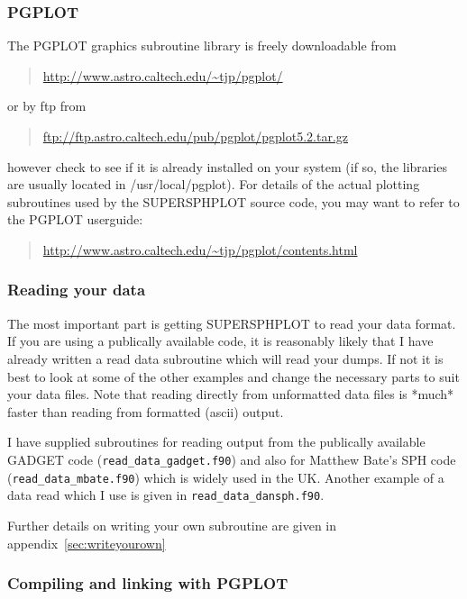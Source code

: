 \documentclass[a4paper,12pt]{article}
\begin{document}
\subsubsection{PGPLOT}
 The PGPLOT
graphics subroutine library is freely downloadable from
\begin{quote}
\url{http://www.astro.caltech.edu/~tjp/pgplot/}
\end{quote}
or by ftp from
\begin{quote}
\url{ftp://ftp.astro.caltech.edu/pub/pgplot/pgplot5.2.tar.gz}
\end{quote}
however check to see if it is already installed on your system (if so, the libraries are
usually located in /usr/local/pgplot). For details of the actual plotting subroutines
used by the SUPERSPHPLOT source code, you may want to refer to the PGPLOT userguide:
\begin{quote}
\url{http://www.astro.caltech.edu/~tjp/pgplot/contents.html}
\end{quote}

\subsubsection{Reading your data}
 The most important part is getting SUPERSPHPLOT to read your data format.
If you are using a publically available code, it is reasonably likely that I
have already written a read data subroutine which will read your dumps.
If not it is best to look at some of the other examples and change the 
necessary parts to suit your data files. Note that reading directly from
unformatted data files is *much* faster than reading from formatted (ascii)
output.   

I have supplied subroutines for reading output from the publically available
GADGET code (\verb+read_data_gadget.f90+) and also for Matthew Bate's SPH code
(\verb+read_data_mbate.f90+) which is widely used in the UK. Another example of a
data read which I use is given in \verb+read_data_dansph.f90+.

Further details on writing your own subroutine are given in
appendix~\ref{sec:writeyourown}

\subsubsection{Compiling and linking with PGPLOT}
\end{document}
